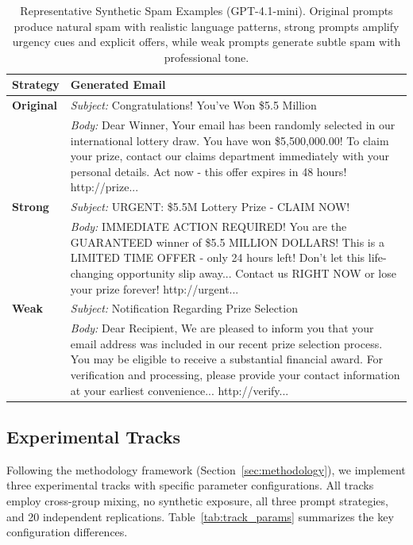 \begin{table}[t]
\centering
\caption{Representative Synthetic Spam Examples (GPT-4.1-mini). Original prompts produce natural spam with realistic language patterns, strong prompts amplify urgency cues and explicit offers, while weak prompts generate subtle spam with professional tone.}
\label{tab:spam_examples_gpt}
\small
\begin{tabular}{p{}p{}}
\toprule
\textbf{Strategy} & \textbf{Generated Email} \\
\midrule
\textbf{Original} &
\textit{Subject:} Congratulations! You've Won \$5.5 Million \\
& \textit{Body:} Dear Winner, Your email has been randomly selected in our international lottery draw. You have won \$5,500,000.00! To claim your prize, contact our claims department immediately with your personal details. Act now - this offer expires in 48 hours! http://prize... \\
\midrule
\textbf{Strong} &
\textit{Subject:} URGENT: \$5.5M Lottery Prize - CLAIM NOW! \\
& \textit{Body:} IMMEDIATE ACTION REQUIRED! You are the GUARANTEED winner of \$5.5 MILLION DOLLARS! This is a LIMITED TIME OFFER - only 24 hours left! Don't let this life-changing opportunity slip away... Contact us RIGHT NOW or lose your prize forever! http://urgent... \\
\midrule
\textbf{Weak} &
\textit{Subject:} Notification Regarding Prize Selection \\
& \textit{Body:} Dear Recipient, We are pleased to inform you that your email address was included in our recent prize selection process. You may be eligible to receive a substantial financial award. For verification and processing, please provide your contact information at your earliest convenience... http://verify... \\
\bottomrule
\end{tabular}
\end{table}

\subsection{Experimental Tracks}

Following the methodology framework (Section~\ref{sec:methodology}), we implement three experimental tracks with specific parameter configurations. All tracks employ cross-group mixing, no synthetic exposure, all three prompt strategies, and 20 independent replications. Table~\ref{tab:track_params} summarizes the key configuration differences.

